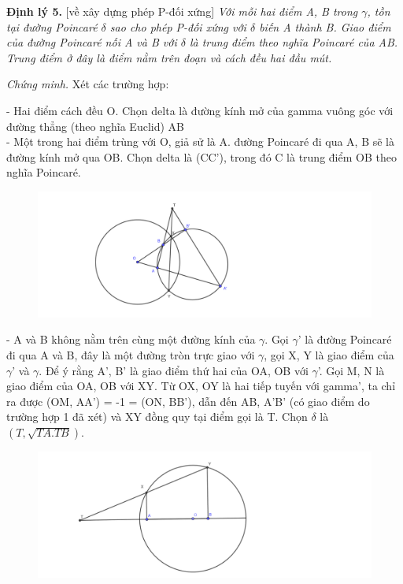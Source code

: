 \textbf{Định lý 5.} [về xây dựng phép P-đối xứng]  \textit{Với mỗi hai điểm A, B trong $\gamma$, tồn tại đường Poincar\'e $\delta$ sao cho phép P-đối xứng với $\delta$ biến A thành B. Giao điểm của đường Poincar\'e nối A và B với $\delta$ là trung điểm theo nghĩa Poincar\'e của AB. Trung điểm ở đây là điểm nằm trên đoạn và cách đều hai đầu mút.}

\textit{Chứng minh.} Xét các trường hợp:

- Hai điểm cách đều O. Chọn delta là đường kính mở của gamma vuông góc với đường thẳng (theo nghĩa Euclid) AB \\
- Một trong hai điểm trùng với O, giả sử là A. đường Poincar\'e đi qua A, B sẽ là đường kính mở qua OB. Chọn delta là (CC’), trong đó C là trung điểm OB theo nghĩa Poincar\'e. \\

\begin{figure}[ht]
\includegraphics[width=\textwidth]{TH_3_dinh_ly_xay_dung.pdf}
\end{figure}

- A và B không nằm trên cùng một đường kính của $\gamma$. Gọi $\gamma$’ là đường Poincar\'e đi qua A và B, đây là một đường tròn trực giao với $\gamma$, gọi X, Y là giao điểm của $\gamma$’ và $\gamma$. Để ý rằng A’, B’ là giao điểm thứ hai của OA, OB với $\gamma$’. Gọi M, N là giao điểm của OA, OB với XY. Từ OX, OY là hai tiếp tuyến với gamma’, ta chỉ ra được (OM, AA’) = -1 = (ON, BB’), dẫn đến AB, A’B’ (có giao điểm do trường hợp 1 đã xét) và XY đồng quy tại điểm gọi là T. Chọn $\delta$ là $(T, \sqrt{TA.TB})$. \\

\begin{figure}[ht]
\includegraphics[width=\textwidth]{TH_4_dinh_ly_xay_dung.pdf}
\end{figure}

